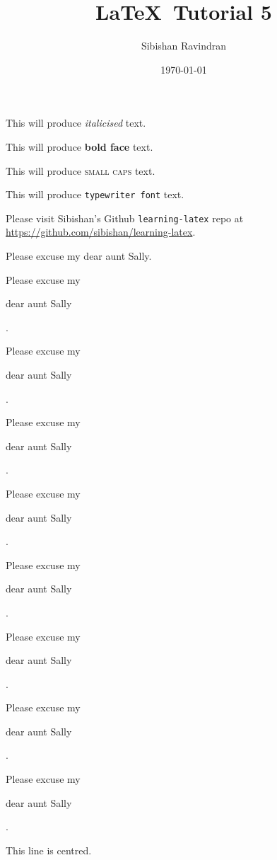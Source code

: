 \documentclass[11pt]{article}
\title{\LaTeX\ Tutorial 5}
\author{Sibishan Ravindran}
\date{\today}
\begin{document}
\tableofcontents
\maketitle

This will produce \textit{italicised} text.

This will produce \textbf{bold face} text.

This will produce \textsc{small caps} text.

This will produce \texttt{typewriter font} text.

Please visit Sibishan's Github \texttt{learning-latex} repo at \url{https://github.com/sibishan/learning-latex}.

\vspace{1cm}

Please excuse my dear aunt Sally.

Please excuse my \begin{large}dear aunt Sally\end{large}.

Please excuse my \begin{Large}dear aunt Sally\end{Large}.

Please excuse my \begin{huge}dear aunt Sally\end{huge}.

Please excuse my \begin{Huge}dear aunt Sally\end{Huge}.

Please excuse my \begin{normalsize}dear aunt Sally\end{normalsize}.

Please excuse my \begin{small}dear aunt Sally\end{small}.

Please excuse my \begin{scriptsize}dear aunt Sally\end{scriptsize}.

Please excuse my \begin{tiny}dear aunt Sally\end{tiny}.

\vspace{1cm}

\begin{center}This line is centred.\end{center}
\end{document}
